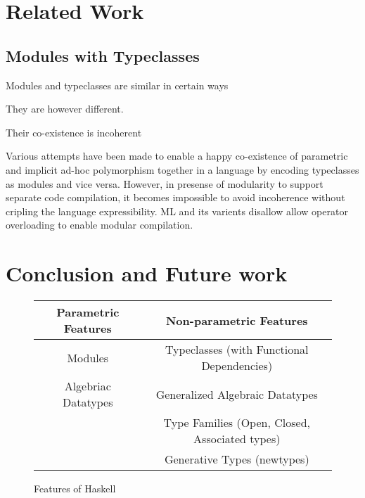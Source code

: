 \documentclass[manuscript,screen,nonacm]{acmart}
\begin{document}

\section{Related Work}
\subsection{Modules with Typeclasses}
Modules and typeclasses are similar in certain ways

They are however different.

Their co-existence is incoherent

Various attempts\cite{dreyer_modular_2007, wehr_ml_2008, white_modular_2014} have been made to enable a happy co-existence of parametric and implicit ad-hoc polymorphism together in a language by encoding typeclasses as modules and vice versa. However, in presense of modularity to support separate code compilation, it becomes impossible to avoid incoherence without cripling the language expressibility.
ML and its varients\cite{milner_definition_1997,leroy_ocaml_2023} disallow allow operator overloading to enable modular compilation.

\section{Conclusion and Future work}\label{sec:conclusion}
\begin{figure}[ht]
  \centering
  \begin{tabular}[ht]{c | c}
    Parametric Features & Non-parametric Features \\
    \hline
    Modules             & Typeclasses (with Functional Dependencies)\\
    Algebriac Datatypes & Generalized Algebraic Datatypes\\
                        & Type Families (Open, Closed, Associated types)\\
                        & Generative Types (newtypes)
  \end{tabular}
  \caption{Features of Haskell}
  \label{fig:haskell-lang-features}
\end{figure}
\end{document}
